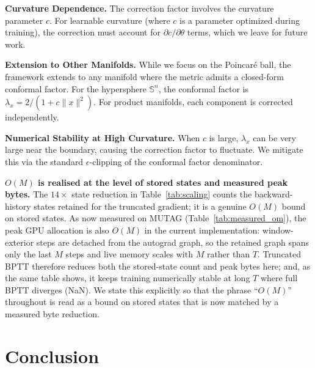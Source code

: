 \documentclass[a4paper,fleqn]{cas-dc}
\begin{document}
\textbf{Curvature Dependence.} The correction factor involves the curvature parameter $c$. For learnable curvature (where $c$ is a parameter optimized during training), the correction must account for $\partial c/\partial\theta$ terms, which we leave for future work.

\textbf{Extension to Other Manifolds.} While we focus on the Poincar\'e ball, the framework extends to any manifold where the metric admits a closed-form conformal factor. For the hypersphere $\mathbb{S}^n$, the conformal factor is $\lambda_x = 2/(1 + c\|x\|^2)$. For product manifolds, each component is corrected independently.

\textbf{Numerical Stability at High Curvature.} When $c$ is large, $\lambda_x$ can be very large near the boundary, causing the correction factor to fluctuate. We mitigate this via the standard $\epsilon$-clipping of the conformal factor denominator.

\textbf{$O(M)$ is realised at the level of stored states and measured peak bytes.} The $14\times$ state reduction in Table~\ref{tab:scaling} counts the backward-history states retained for the truncated gradient; it is a genuine $O(M)$ bound on stored states. As now measured on MUTAG (Table~\ref{tab:measured_om}), the peak GPU allocation is also $O(M)$ in the current implementation: window-exterior steps are detached from the autograd graph, so the retained graph spans only the last $M$ steps and live memory scales with $M$ rather than $T$. Truncated BPTT therefore reduces both the stored-state count and peak bytes here; and, as the same table shows, it keeps training numerically stable at long $T$ where full BPTT diverges (NaN). We state this explicitly so that the phrase ``$O(M)$'' throughout is read as a bound on stored states that is now matched by a measured byte reduction.

\section{Conclusion}
\end{document}
